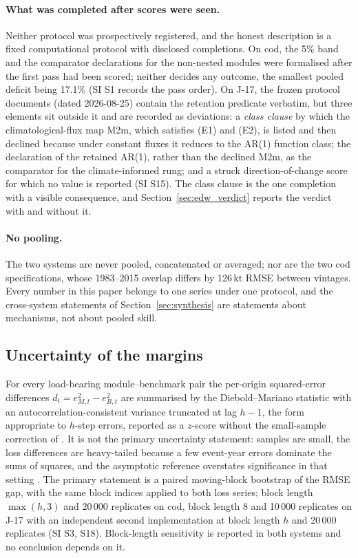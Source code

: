 \documentclass[preprint,11pt,authoryear]{elsarticle}
\theoremstyle{definition}
\theoremstyle{remark}
\begin{document}
\paragraph{What was completed after scores were seen.} Neither protocol was prospectively registered, and the honest description is a fixed computational protocol with disclosed completions. On cod, the 5\% band and the comparator declarations for the non-nested modules were formalised after the first pass had been scored; neither decides any outcome, the smallest pooled deficit being 17.1\% (SI S1 records the pass order). On J-17, the frozen protocol documents (dated 2026-08-25) contain the retention predicate verbatim, but three elements sit outside it and are recorded as deviations: a \emph{class clause} by which the climatological-flux map M2m, which satisfies (E1) and (E2), is listed and then declined because under constant fluxes it reduces to the AR(1) function class; the declaration of the retained AR(1), rather than the declined M2m, as the comparator for the climate-informed rung; and a struck direction-of-change score for which no value is reported (SI S15). The class clause is the one completion with a visible consequence, and Section~\ref{sec:edw_verdict} reports the verdict with and without it.

\paragraph{No pooling.} The two systems are never pooled, concatenated or averaged; nor are the two cod specifications, whose 1983--2015 overlap differs by 126\,kt RMSE between vintages. Every number in this paper belongs to one series under one protocol, and the cross-system statements of Section~\ref{sec:synthesis} are statements about mechanisms, not about pooled skill.

\subsection{Uncertainty of the margins}\label{sec:uncertainty}

For every load-bearing module--benchmark pair the per-origin squared-error differences $d_t = e^2_{M,t}-e^2_{B,t}$ are summarised by the Diebold--Mariano statistic \citep{Diebold1995} with an autocorrelation-consistent variance truncated at lag $h-1$, the form appropriate to $h$-step errors, reported as a $z$-score without the small-sample correction of \citet{Harvey1997}. It is not the primary uncertainty statement: samples are small, the loss differences are heavy-tailed because a few event-year errors dominate the sums of squares, and the asymptotic reference overstates significance in that setting \citep{Diebold2015}. The primary statement is a paired moving-block bootstrap \citep{Kunsch1989} of the RMSE gap, with the same block indices applied to both loss series; block length $\max(h,3)$ and 20\,000 replicates on cod, block length 8 and 10\,000 replicates on J-17 with an independent second implementation at block length $h$ and 20\,000 replicates (SI S3, S18). Block-length sensitivity is reported in both systems and no conclusion depends on it.
\end{document}
